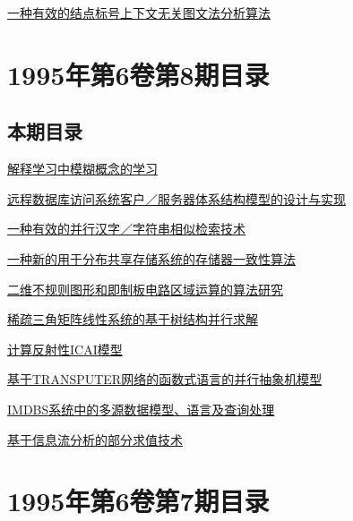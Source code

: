 \documentclass[a4paper]{article}
\begin{document}
\href{http://www.jos.org.cn/ch/reader/download_pdf.aspx?file_no=19950907&year_id=1995&quarter_id=9&falg=1}{一种有效的结点标号上下文无关图文法分析算法}


\section{\textbf{1995年第6卷第8期目录}}
\subsection{本期目录}
\href{http://www.jos.org.cn/ch/reader/download_pdf.aspx?file_no=19950801&year_id=1995&quarter_id=8&falg=1}{解释学习中模糊概念的学习}

\href{http://www.jos.org.cn/ch/reader/download_pdf.aspx?file_no=19950802&year_id=1995&quarter_id=8&falg=1}{远程数据库访问系统客户／服务器体系结构模型的设计与实现}

\href{http://www.jos.org.cn/ch/reader/download_pdf.aspx?file_no=19950803&year_id=1995&quarter_id=8&falg=1}{一种有效的并行汉字／字符串相似检索技术}

\href{http://www.jos.org.cn/ch/reader/download_pdf.aspx?file_no=19950804&year_id=1995&quarter_id=8&falg=1}{一种新的用于分布共享存储系统的存储器一致性算法}

\href{http://www.jos.org.cn/ch/reader/download_pdf.aspx?file_no=19950805&year_id=1995&quarter_id=8&falg=1}{二维不规则图形和即制板电路区域运算的算法研究}

\href{http://www.jos.org.cn/ch/reader/download_pdf.aspx?file_no=19950806&year_id=1995&quarter_id=8&falg=1}{稀疏三角矩阵线性系统的基于树结构并行求解}

\href{http://www.jos.org.cn/ch/reader/download_pdf.aspx?file_no=19950807&year_id=1995&quarter_id=8&falg=1}{计算反射性ICAI模型}

\href{http://www.jos.org.cn/ch/reader/download_pdf.aspx?file_no=19950808&year_id=1995&quarter_id=8&falg=1}{基于TRANSPUTER网络的函数式语言的并行抽象机模型}

\href{http://www.jos.org.cn/ch/reader/download_pdf.aspx?file_no=19950809&year_id=1995&quarter_id=8&falg=1}{IMDBS系统中的多源数据模型、语言及查询处理}

\href{http://www.jos.org.cn/ch/reader/download_pdf.aspx?file_no=19950810&year_id=1995&quarter_id=8&falg=1}{基于信息流分析的部分求值技术}


\section{\textbf{1995年第6卷第7期目录}}
\end{document}
